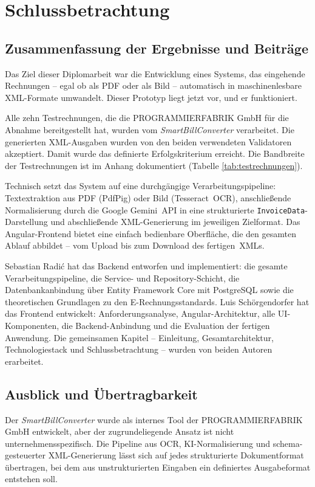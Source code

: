 \chapter{Schlussbetrachtung}
\label{chap:schlussbetrachtung}

\section{Zusammenfassung der Ergebnisse und Beiträge}
Das Ziel dieser Diplomarbeit war die Entwicklung eines Systems, das eingehende
Rechnungen -- egal ob als PDF oder als Bild -- automatisch in maschinenlesbare
XML-Formate umwandelt. Dieser Prototyp liegt jetzt vor, und er funktioniert.

Alle zehn Testrechnungen, die die PROGRAMMIERFABRIK GmbH für die Abnahme
bereitgestellt hat, wurden vom \textit{SmartBillConverter} verarbeitet.
Die generierten XML-Ausgaben wurden von den beiden verwendeten Validatoren akzeptiert.
Damit wurde das definierte Erfolgskriterium erreicht. Die Bandbreite der Testrechnungen ist im Anhang dokumentiert (Tabelle \ref{tab:testrechnungen}).

Technisch setzt das System auf eine durchgängige Verarbeitungspipeline:
Textextraktion aus PDF (PdfPig) oder Bild (Tesseract~OCR), anschließende
Normalisierung durch die Google Gemini~API in eine strukturierte
\texttt{InvoiceData}-Darstellung und abschließende XML-Generierung im
jeweiligen Zielformat. Das Angular-Frontend bietet eine einfach bedienbare
Oberfläche, die den gesamten Ablauf abbildet -- vom Upload bis zum Download
des fertigen~XMLs.

Sebastian Radić hat das Backend entworfen und implementiert: die gesamte
Verarbeitungspipeline, die Service- und Repository-Schicht, die Datenbankanbindung
über Entity Framework Core mit PostgreSQL sowie die theoretischen Grundlagen
zu den E-Rechnungsstandards. Luis Schörgendorfer hat das Frontend entwickelt:
Anforderungsanalyse, Angular-Architektur, alle UI-Komponenten, die Backend-Anbindung
und die Evaluation der fertigen Anwendung. Die gemeinsamen Kapitel -- Einleitung,
Gesamtarchitektur, Technologiestack und Schlussbetrachtung -- wurden von
beiden Autoren erarbeitet.

\section{Ausblick und Übertragbarkeit}
Der \textit{SmartBillConverter} wurde als internes Tool der PROGRAMMIERFABRIK GmbH
entwickelt, aber der zugrundeliegende Ansatz ist nicht unternehmensspezifisch.
Die Pipeline aus OCR, KI-Normalisierung und schema-gesteuerter XML-Generierung
lässt sich auf jedes strukturierte Dokumentformat übertragen, bei dem aus
unstrukturierten Eingaben ein definiertes Ausgabeformat entstehen soll.

